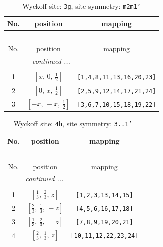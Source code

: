 \documentclass[fleqn,8pt]{jsarticle}
\begin{document}
\begin{longtable}{ccc}
\caption{Wyckoff site: {\tt 3g}, site symmetry: {\tt m2m1'}}
 \\
 \hline \hline
No. & position & mapping \\ \hline \endfirsthead

\multicolumn{2}{l}{\tablename\ \thetable{}} \\
 \hline \hline
No. & position & mapping \\ \hline \endhead

 \hline \hline
\multicolumn{2}{r}{\footnotesize\it continued ...} \\ \endfoot

 \hline \hline
\multicolumn{2}{r}{} \\ \endlastfoot

1 & $\left[ x,\, 0,\, \frac{1}{2} \right]$ & {\tt [1,4,8,11,13,16,20,23]} \\ \hline
2 & $\left[ 0,\, x,\, \frac{1}{2} \right]$ & {\tt [2,5,9,12,14,17,21,24]} \\ \hline
3 & $\left[ - x,\, - x,\, \frac{1}{2} \right]$ & {\tt [3,6,7,10,15,18,19,22]} \\
\end{longtable}
\renewcommand{\arraystretch}{1.2}
\begin{longtable}{ccc}
\caption{Wyckoff site: {\tt 4h}, site symmetry: {\tt 3..1'}}
 \\
 \hline \hline
No. & position & mapping \\ \hline \endfirsthead

\multicolumn{2}{l}{\tablename\ \thetable{}} \\
 \hline \hline
No. & position & mapping \\ \hline \endhead

 \hline \hline
\multicolumn{2}{r}{\footnotesize\it continued ...} \\ \endfoot

 \hline \hline
\multicolumn{2}{r}{} \\ \endlastfoot

1 & $\left[ \frac{1}{3},\, \frac{2}{3},\, z \right]$ & {\tt [1,2,3,13,14,15]} \\ \hline
2 & $\left[ \frac{2}{3},\, \frac{1}{3},\, - z \right]$ & {\tt [4,5,6,16,17,18]} \\ \hline
3 & $\left[ \frac{1}{3},\, \frac{2}{3},\, - z \right]$ & {\tt [7,8,9,19,20,21]} \\ \hline
4 & $\left[ \frac{2}{3},\, \frac{1}{3},\, z \right]$ & {\tt [10,11,12,22,23,24]} \\
\end{longtable}
\end{document}

